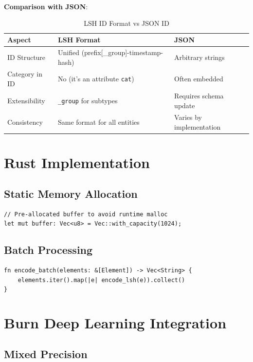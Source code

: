 \documentclass{article}
\begin{document}
\textbf{Comparison with JSON}:

\begin{table}[h]
\centering
\caption{LSH ID Format vs JSON ID}
\label{tab:lsh-id}
\begin{tabular}{lll}
\toprule
\textbf{Aspect} & \textbf{LSH Format} & \textbf{JSON} \\
\midrule
ID Structure & Unified (prefix[\_group]-timestamp-hash) & Arbitrary strings \\
Category in ID & No (it's an attribute \texttt{cat}) & Often embedded \\
Extensibility & \texttt{\_group} for subtypes & Requires schema update \\
Consistency & Same format for all entities & Varies by implementation \\
\bottomrule
\end{tabular}
\end{table}

\section{Rust Implementation}

\subsection{Static Memory Allocation}

\begin{verbatim}
// Pre-allocated buffer to avoid runtime malloc
let mut buffer: Vec<u8> = Vec::with_capacity(1024);
\end{verbatim}

\subsection{Batch Processing}

\begin{verbatim}
fn encode_batch(elements: &[Element]) -> Vec<String> {
    elements.iter().map(|e| encode_lsh(e)).collect()
}
\end{verbatim}

\section{Burn Deep Learning Integration}

\subsection{Mixed Precision}
\end{document}

